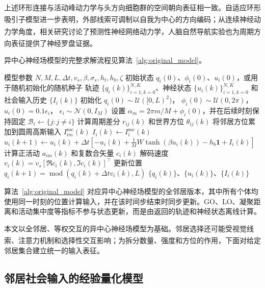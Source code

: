 \documentclass[UTF8,fontset=windows,11pt]{ctexart}
\newcommand{\upcite}[1]{\textsuperscript{\cite{#1}}}
\begin{document}
上述环形连接与活动峰动力学与头方向细胞群的空间朝向表征\upcite{Zhang1996}相一致。自适应环形吸引子模型进一步表明，外部线索可调制以自我为中心的方向编码\upcite{Chen2026}；从连续神经动力学角度，相关研究讨论了预测性神经网络动力学\upcite{Ao2021}，人脑自然导航实验也为周期方向表征提供了神经罗盘证据\upcite{Lu2025}。

异中心神经场模型的完整求解流程见算法~\ref{alg:original_model}。

\begin{algorithm}[htbp]
 \caption{异中心神经场模型的求解流程}
 \label{alg:original_model}
 \begin{algorithmic}[1]
 \Require 模型参数 $N,M,L,\Delta t,v_s,\beta,\sigma_s,h_t,h_b,\zeta$
 \Require 初始状态 $q_i(0)$、$\phi_i(0)$、$u_i(0)$，或用于随机初始化的随机种子
 \Ensure 轨迹 $\{q_i(k)\}_{i=1,k=0}^{N,K}$、神经状态 $\{u_i(k)\}_{i=1,k=0}^{N,K}$ 和社会输入历史 $\{I_i(k)\}$
 \State 初始化
 $q_i(0)\sim\mathcal U([0,L)^2)$，
 $\phi_i(0)\sim\mathcal U(0,2\pi)$，
 $u_i(0)=0.1\epsilon_i$，
 $\epsilon_i\sim\mathcal N(0,I_M)$
 \State 设置 $\alpha_m=2\pi m/M+\phi_i(0)$，并在后续时刻保持固定
   \State $\mathcal B_i\leftarrow\{j:j\ne i\}$
    \State 计算周期差分 $r_{ij}(k)$ 和世界方位 $\theta_{ij}(k)$
    \State 将邻居方位累加到圆周高斯输入 $I^{\mathrm{soc}}_{im}(k)$
   \EndFor
   \State $I_i(k)\leftarrow I^{\mathrm{soc}}_{i}(k)$
   \State $u_i(k+1)\leftarrow
   u_i(k)+\Delta t\left[-u_i(k)+\frac{1}{M}W\tanh(\beta u_i(k))-h_b\mathbf 1+I_i(k)\right]$
   \State 计算正活动 $a_{im}(k)$ 和复数合矢量 $c_i(k)$
   \State 解码速度 $v_i(k)=v_s[\Re c_i(k),\Im c_i(k)]^\top$
  \EndFor
   \State 更新位置 $q_i(k+1)=\operatorname{mod}(q_i(k)+\Delta t v_i(k),L)$
  \EndFor
 \EndFor
 \State \Return $\{q_i(k)\}$、$\{u_i(k)\}$、$\{I_i(k)\}$
 \end{algorithmic}
\end{algorithm}

算法~\ref{alg:original_model} 对应异中心神经场模型的全邻居版本，其中所有个体均使用同一时刻的位置计算输入，并在该时间步结束时同步更新。GO、LO、凝聚距离和活动集中度等指标不参与状态更新，而是由返回的轨迹和神经状态离线计算。

本文以全邻居、等权交互的异中心神经场模型为基础。邻居选择还可能受视觉线索\upcite{Krongauz2024}、注意力机制\upcite{Li2024}和选择性交互\upcite{Xue2025}影响；为拆分数量、强度和方位的作用，下面对给定邻居集合建立统一的输入表征。


\subsection{邻居社会输入的经验量化模型}
\label{sec:social_input_model}
\end{document}
